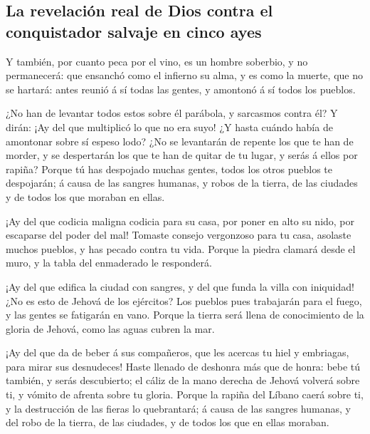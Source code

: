 \hypertarget{la-revelaciuxf3n-real-de-dios-contra-el-conquistador-salvaje-en-cinco-ayes}{%
\subsection{La revelación real de Dios contra el conquistador salvaje en
cinco
ayes}\label{la-revelaciuxf3n-real-de-dios-contra-el-conquistador-salvaje-en-cinco-ayes}}

 Y también, por cuanto peca por el vino, es un hombre
soberbio, y no permanecerá: que ensanchó como el infierno su alma, y es
como la muerte, que no se hartará: antes reunió á sí todas las gentes, y
amontonó á sí todos los pueblos.

 ¿No han de levantar todos estos sobre él parábola, y
sarcasmos contra él? Y dirán: ¡Ay del que multiplicó lo que no era suyo!
¿Y hasta cuándo había de amontonar sobre sí espeso lodo? 
¿No se levantarán de repente los que te han de morder, y se despertarán
los que te han de quitar de tu lugar, y serás á ellos por rapiña?
 Porque tú has despojado muchas gentes, todos los otros
pueblos te despojarán; á causa de las sangres humanas, y robos de la
tierra, de las ciudades y de todos los que moraban en ellas.

 ¡Ay del que codicia maligna codicia para su casa, por
poner en alto su nido, por escaparse del poder del mal! 
Tomaste consejo vergonzoso para tu casa, asolaste muchos pueblos, y has
pecado contra tu vida.  Porque la piedra clamará desde el
muro, y la tabla del enmaderado le responderá.

 ¡Ay del que edifica la ciudad con sangres, y del que
funda la villa con iniquidad!  ¿No es esto de Jehová de
los ejércitos? Los pueblos pues trabajarán para el fuego, y las gentes
se fatigarán en vano.  Porque la tierra será llena de
conocimiento de la gloria de Jehová, como las aguas cubren la mar.

 ¡Ay del que da de beber á sus compañeros, que les
acercas tu hiel y embriagas, para mirar sus desnudeces! 
Haste llenado de deshonra más que de honra: bebe tú también, y serás
descubierto; el cáliz de la mano derecha de Jehová volverá sobre ti, y
vómito de afrenta sobre tu gloria.  Porque la rapiña del
Líbano caerá sobre ti, y la destrucción de las fieras lo quebrantará; á
causa de las sangres humanas, y del robo de la tierra, de las ciudades,
y de todos los que en ellas moraban.


